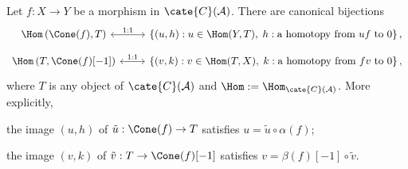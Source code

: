 \begin{proposition}\label{prop:homotopy-kernel-cokernel}
	Let $f:X\to Y$ be a morphism in $\cate{C}(\mathcal{A})$. There are
	canonical bijections
	\[\begin{tikzcd}[row sep=small]
		\Hom\left( \Cone(f), T \right) \arrow[leftrightarrow, r, "1:1"] & \left\{ (u, h): u \in \Hom(Y,T), \; h: \text{a homotopy from $uf$ to $0$} \right\}, \\
		\Hom\left( T, \Cone(f)[-1] \right) \arrow[leftrightarrow, r, "1:1"] & \left\{ (v, k): v \in \Hom(T,X), \; k: \text{a homotopy from $fv$ to $0$} \right\},
	\end{tikzcd}\]
	where $T$ is any object of $\cate{C}(\mathcal{A})$ and
	$\Hom:=\Hom_{\cate{C}(\mathcal{A})}$. More explicitly,
	\begin{compactitem}
		\item the image $(u,h)$ of $\tilde{u}:\Cone(f)\to T$ satisfies
		$u=\tilde{u}\circ\alpha(f)$;
		\item the image $(v,k)$ of $\tilde{v}:T\to\Cone(f)[-1]$ satisfies
		$v=\beta(f)[-1]\circ\tilde{v}$.
	\end{compactitem}
\end{proposition}
